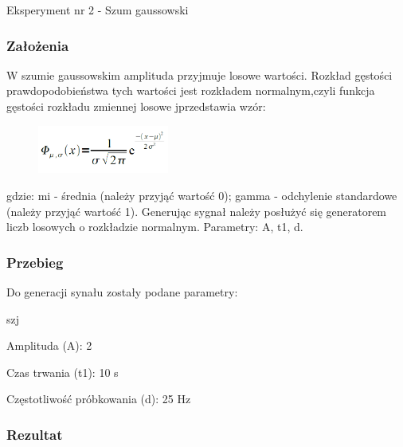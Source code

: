 \documentclass[12pt]{article}
\begin{document}
Eksperyment nr 2  - Szum gaussowski

\subsubsection{Założenia}
W szumie gaussowskim amplituda przyjmuje losowe wartości. Rozkład gęstości prawdopodobieństwa tych wartości jest rozkładem normalnym,czyli funkcja gęstości rozkładu zmiennej losowe jprzedstawia wzór:

\begin{figure}[h!]
 \centering
 \includegraphics[width=4.3cm]{GaussWzor.PNG}
 \vspace{-0.3cm}
 \label{gw}
\end{figure}

gdzie:
mi - średnia (należy przyjąć wartość 0);
gamma - odchylenie standardowe (należy przyjąć wartość 1).
Generując sygnał należy posłużyć się generatorem liczb losowych o rozkładzie
normalnym.
Parametry: A, t1, d.

\subsubsection{Przebieg}
Do generacji synału zostały podane parametry:

\begin{labeling}{szj}
\item [Amplituda (A):] 2
\item [Czas trwania (t1):] 10 s
\item [Częstotliwość próbkowania (d): ] 25 Hz
\end{labeling}
\subsubsection{Rezultat}
\end{document}
